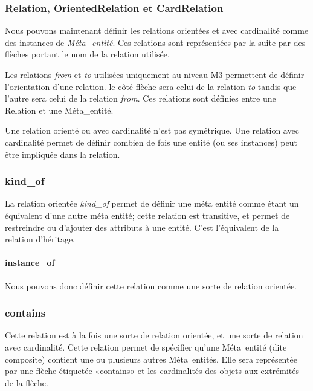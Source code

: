 \documentclass[french,a4paper,titlepage]{article}
\begin{document}
			\subsubsection{Relation, OrientedRelation et CardRelation}
			
				Nous pouvons maintenant définir les relations orientées et avec
				cardinalité comme des instances de \emph{Méta\_entité}.
				Ces relations sont représentées par la suite par des flèches portant le
				nom de la relation utilisée.
				
				Les relations \emph{from} et \emph{to} utilisées uniquement au niveau M3
				permettent de définir l'orientation d'une relation. le côté flèche sera
				celui de la relation \emph{to} tandis que l'autre sera celui de la
				relation \emph{from}. Ces relations sont définies entre une Relation et
				une Méta\_entité.
				
				Une relation orienté ou avec cardinalité n'est pas symétrique. Une
				relation avec cardinalité permet de définir combien de fois une entité
				(ou ses instances) peut être impliquée dans la relation.
				
			\subsubsection{kind\_of}
			
				La relation orientée \emph{kind\_of} permet de définir une méta entité
				comme étant un équivalent d'une autre méta entité; cette relation est
				transitive, et permet de restreindre ou d'ajouter des attributs à une
				entité. C'est l'équivalent de la relation d'héritage. 
				
				\paragraph{instance\_of} Nous pouvons donc définir cette relation comme
				une sorte de relation orientée.
				
			\subsubsection{contains}
			
				Cette relation est à la fois une sorte de relation orientée, et une
				sorte de relation avec cardinalité. Cette relation permet de spécifier
				qu'une Méta~entité (dite composite) contient une ou plusieurs autres
				Méta~entités. Elle sera représentée par une flèche étiquetée «contains»
				et les cardinalités des objets aux extrémités de la flèche.
				
\end{document}
